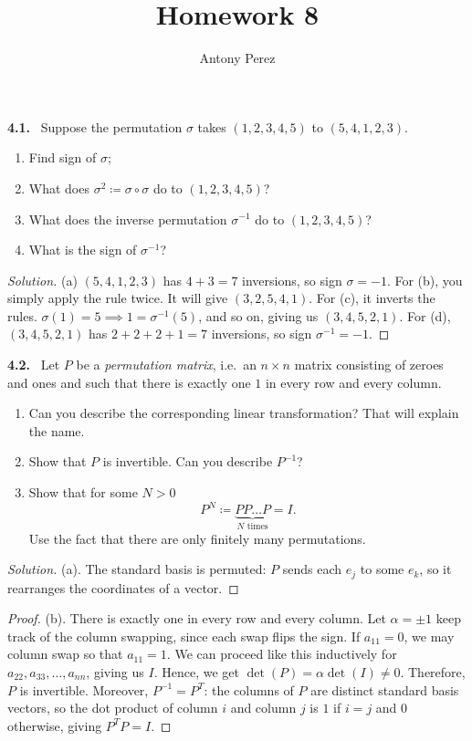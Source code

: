 \documentclass[12pt]{amsart}
\title{Homework 8}
\author{Antony Perez}
\newcommand{\inv}{^{-1}}                    %
\theoremstyle{plain}
\theoremstyle{definition}
\theoremstyle{remark}
\newenvironment{problem}[1]{\par\medskip\noindent\textbf{#1.}\ }{\par\smallskip}
\newenvironment{solution}{\begin{proof}[Solution]}{\end{proof}}
\begin{document}
\maketitle

\begin{problem}{4.1}
Suppose the permutation $\sigma$ takes $(1,2,3,4,5)$ to $(5,4,1,2,3)$.
\begin{enumerate}
  \item Find sign of $\sigma$;
  \item What does $\sigma^2 \coloneqq \sigma\circ\sigma$ do to $(1,2,3,4,5)$?
  \item What does the inverse permutation $\sigma\inv$ do to $(1,2,3,4,5)$?
  \item What is the sign of $\sigma\inv$?
\end{enumerate}
\end{problem}

\begin{solution}
(a) $(5,4,1,2,3)$ has $4 + 3 = 7$ inversions, so sign $\sigma = -1$. For (b), you simply apply the rule twice. It will give $(3,2,5,4,1)$. For (c), it inverts the rules. $\sigma(1) = 5 \implies 1 = \sigma^{-1}(5)$, and so on, giving us $(3,4,5,2,1)$. For (d), $(3,4,5,2,1)$ has $2+2+2+1 = 7$ inversions, so sign $\sigma^{-1}= -1$.
\end{solution}

\begin{problem}{4.2}
Let $P$ be a \emph{permutation matrix}, i.e.\ an $n\times n$ matrix consisting of zeroes and ones and such that there is exactly one $1$ in every row and every column.
\begin{enumerate}
  \item Can you describe the corresponding linear transformation? That will explain the name.
  \item Show that $P$ is invertible. Can you describe $P\inv$?
  \item Show that for some $N > 0$
  \[
    P^N \coloneqq \underbrace{PP\dots P}_{N \text{ times}} = I.
  \]
  Use the fact that there are only finitely many permutations.
\end{enumerate}
\end{problem}

\begin{solution}
    (a). The standard basis is permuted: $P$ sends each $e_j$ to some $e_k$, so it rearranges the coordinates of a vector.
\end{solution}
\begin{proof}
    (b). There is exactly one in every row and every column. Let $\alpha = \pm 1$ keep track of the column swapping, since each swap flips the sign. If $a_{11} = 0$, we may column swap so that $a_{11} = 1$. We can proceed like this inductively for $a_{22},a_{33},\ldots,a_{nn}$, giving us $I$. Hence, we get $\det(P)=\alpha \det(I) \neq 0$. Therefore, $P$ is invertible. Moreover, $P\inv = P^T$: the columns of $P$ are distinct standard basis vectors, so the dot product of column $i$ and column $j$ is $1$ if $i = j$ and $0$ otherwise, giving $P^TP = I$.
\end{proof}
\end{document}

